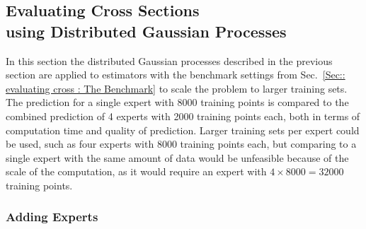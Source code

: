 \documentclass[twoside,english]{uiofysmaster}
\begin{document}
{%
 


\subsection{Evaluating Cross Sections\\ using Distributed Gaussian Processes}

In this section the distributed Gaussian processes described in the previous section are applied to estimators with the benchmark settings from Sec.~\ref{Sec:: evaluating cross : The Benchmark} to scale the problem to larger training sets. The prediction for a single expert with 8000 training points is compared to the combined prediction of 4 experts with 2000 training points each, both in terms of computation time and quality of prediction. Larger training sets per expert could be used, such as four experts with 8000 training points each, but comparing to a single expert with the same amount of data would be unfeasible because of the scale of the computation, as it would require an expert with $4 \times 8000 = 32 000$ training points.

\subsubsection{Adding Experts}

}
\end{document}
